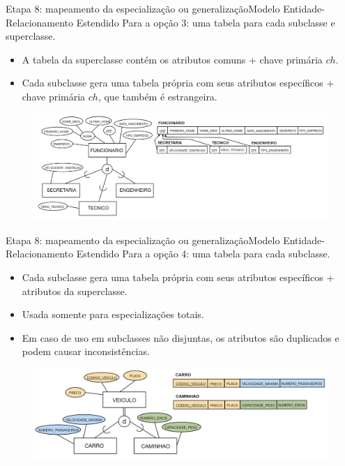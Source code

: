 \documentclass[t]{beamer}
\begin{document}

\begin{ftst}{Etapa 8: mapeamento da especialização ou generalização}{Modelo Entidade-Relacionamento Estendido}
\small
Para a opção 3: uma tabela para cada subclasse e superclasse.
\begin{itemize}
    \item A tabela da superclasse contém os atributos comuns + chave primária $ch$.
    \item Cada subclasse gera uma tabela própria com seus atributos específicos + chave primária $ch$, que também é estrangeira. 
\end{itemize}
\begin{figure}
    \centering
    \includegraphics[scale=0.11]{Figuras/03_15.png}
\end{figure}
\end{ftst}


\begin{ftst}{Etapa 8: mapeamento da especialização ou generalização}{Modelo Entidade-Relacionamento Estendido}
\small
Para a opção 4: uma tabela para cada subclasse.
\begin{itemize}
    \item Cada subclasse gera uma tabela própria com seus atributos específicos + atributos da superclasse.
    \item Usada somente para especializações totais.
    \item Em caso de uso em subclasses não disjuntas, os atributos são duplicados e podem causar inconsistências.
\end{itemize}
\begin{figure}
    \centering
    \includegraphics[scale=0.11]{Figuras/03_16.png}
\end{figure}
\end{ftst}
\end{document}
